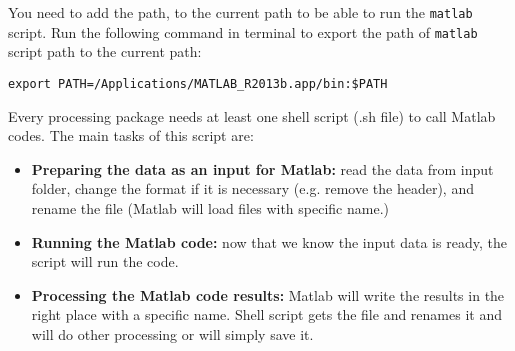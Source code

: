 \noindent
You need to add the path, to the current path to be able to run the \texttt{matlab} script. Run the following command in terminal to export the path of \texttt{matlab} script path to the current path:

\begin{mdframed}[hidealllines=true,backgroundcolor=gray!20]
\fontsize{10pt}{1pt}
\texttt{export PATH=/Applications/MATLAB\_R2013b.app/bin:\$PATH}
\end{mdframed}


\noindent
Every processing package needs at least one shell script (.sh file) to call Matlab codes. The main tasks of this script are:

\begin{itemize} 
  \item   \textbf{Preparing the data as an input for Matlab:} read the data from input folder, change the format if it is necessary (e.g. remove the header), and rename the file (Matlab will load files with specific name.)
    \item \textbf{Running the Matlab code:} now that we know the input data is ready, the script will run the code.
  \item  \textbf{Processing the Matlab code results:} Matlab will write the results in the right place with a specific name. Shell script gets the file and renames it and will do other processing or will simply save it.

\end{itemize}

